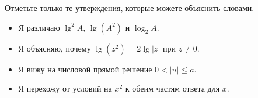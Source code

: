 \begin{questionsbox}
  Отметьте только те утверждения, которые можете объяснить словами.
  \begin{itemize}[label=\choicebox,leftmargin=2.4em]
    \item Я различаю \(\lg^2 A\), \(\lg(A^2)\) и \(\log_2 A\).
    \item Я объясняю, почему \(\lg(z^2)=2\lg|z|\) при \(z\ne0\).
    \item Я вижу на числовой прямой решение \(0<|u|\le a\).
    \item Я перехожу от условий на \(x^2\) к обеим частям ответа для \(x\).
  \end{itemize}
\end{questionsbox}
